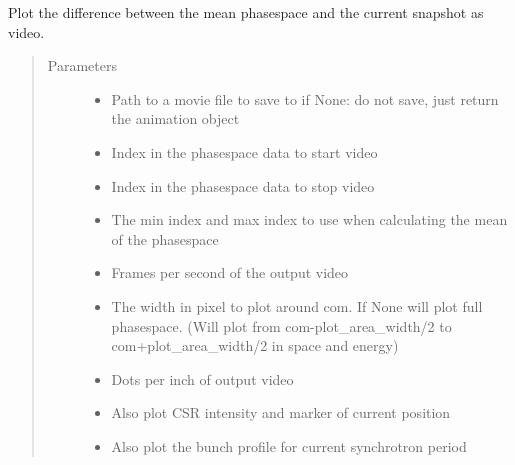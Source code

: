 \documentclass[letterpaper,10pt,openany,oneside,english]{sphinxmanual}
\begin{document}
\begin{fulllineitems}
\begin{fulllineitems}
\label{\detokenize{plots:plots.PhaseSpace.microstructure_movie}}
Plot the difference between the mean phasespace and the current snapshot as video.
\begin{quote}\begin{description}
\item[{Parameters}] \leavevmode\begin{itemize}
\item {} 
 \textendash{} Path to a movie file to save to if None: do not save, just return the animation  
object

\item {} 
 \textendash{} Index in the phasespace data to start video

\item {} 
 \textendash{} Index in the phasespace data to stop video

\item {} 
 \textendash{} The min index and max index to use when calculating the mean of the  
phasespace

\item {} 
 \textendash{} Frames per second of the output video

\item {} 
 \textendash{} The width in pixel to plot around com. If None will plot full  
phasespace.  
(Will plot from com-plot\_area\_width/2 to com+plot\_area\_width/2 in space and energy)

\item {} 
 \textendash{} Dots per inch of output video

\item {} 
 \textendash{} Also plot CSR intensity and marker of current position

\item {} 
 \textendash{} Also plot the bunch profile for current synchrotron period


\end{itemize}
\end{description}
\end{quote}
\end{fulllineitems}
\end{fulllineitems}
\end{document}

